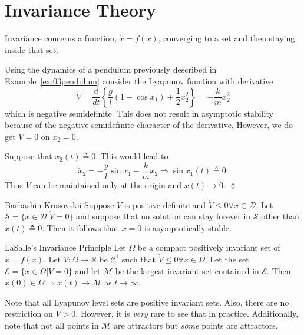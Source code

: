 
\mainmatter%
\setcounter{page}{1}

\lectureseries[\course]{\course}

\date{February 9, 2010}

\setaddress%

\setcounter{lecture}{10}
\setcounter{chapter}{10}


\section{Invariance Theory}
Invariance concerns a function, $\dot{x}=f(x)$, converging to a set and then staying inside that set.

\begin{example}
Using the dynamics of a pendulum previously described in Example~\ref{ex:03pendulum} consider the Lyapunov function with derivative
$$\dot{V} = \frac{d}{dt}\left\{\frac{g}{l}\left(1-\cos x_1\right) + \frac{1}{2}x_2^2\right\} = -\frac{k}{m}x_2^2$$
which is negative semidefinite. This does not result in asymptotic stability because of the negative semidefinite character of the derivative. However, we do get $\dot{V}=0$ on $x_2=0$.

Suppose that $x_2(t)\triangleq0$. This would lead to
$$\dot{x}_2 = -\frac{g}{l}\sin x_1 - \frac{k}{m}x_2 \Rightarrow \sin x_1(t) \triangleq 0.$$
Thus $\dot{V}$ can be maintained only at the origin and $x(t)\to0$.
$\lozenge$
\end{example}

\begin{theorem}{Barbashin-Krasovskii}
Suppose $V$ is positive definite and $\dot{V}\leq0 \forall x\in\mathcal{D}$. Let $\mathcal{S}=\{x\in\mathcal{D} | \dot{V} = 0\}$ and suppose that no solution can stay forever in $\mathcal{S}$ other than $x(t)\triangleq0$. Then it follows that $x=0$ is asymptotically stable.
\end{theorem}

\begin{theorem}{LaSalle's Invariance Principle}
Let $\Omega$ be a compact positively invariant set of $\dot{x}=f(x)$. Let $V:\Omega\to\mathbb{R}$ be $\mathcal{C}^1$ such that $\dot{V}\leq0 \forall x \in \Omega$. Let the set $\mathcal{E}=\{x\in\Omega | \dot{V}=0\}$ and let $\mathcal{M}$ be the largest invariant set contained in $\mathcal{E}$. Then $x(0)\in\Omega \Rightarrow x(t)\to\mathcal{M}$ as $t\to\infty$.
\end{theorem}
Note that all Lyapunov level sets are positive invariant sets. Also, there are no restriction on $V>0$. However, it is \textit{very} rare to see that in practice. Additionally, note that not all points in $\mathcal{M}$ are attractors but \textit{some} points are attractors.

